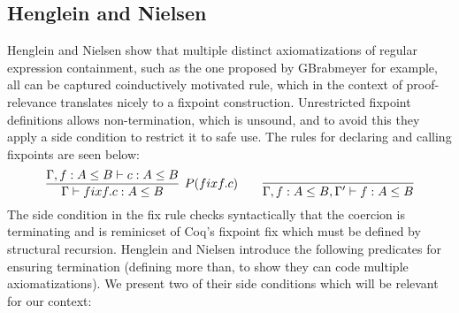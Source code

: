 \documentclass[a4paper,UKenglish,cleveref, autoref, thm-restate]{lipics-v2021}
\begin{document}
\subsection{Henglein and Nielsen}
Henglein and Nielsen show that multiple distinct axiomatizations of regular expression containment, such as the one proposed by GBrabmeyer for example, all can be captured coinductively motivated rule, which in the context of proof-relevance translates nicely to a fixpoint construction. Unrestricted fixpoint definitions allows non-termination, which is unsound, and to avoid this they apply a side condition to restrict it to safe use. The rules for declaring and calling fixpoints are seen below:
\begin{displaymath}
\infer[P(\fix f.c)]{ \containsG{\fix f.c}{A}{B}}{\contains{\Gamma,f : A \leq B}{c}{A}{B}} \qquad
 \infer{\contains{\Gamma ,f : A \leq B, \Gamma'}{ f}{A}{B}}{}
\end{displaymath}
The side condition in the fix rule checks syntactically that the coercion is terminating and is reminicset of Coq's fixpoint \textsf{fix} which must be defined by structural recursion. Henglein and Nielsen introduce the following predicates for ensuring termination (defining more than, to show they can code multiple axiomatizations). We present two of their side conditions which will be relevant for our context:
\end{document}
